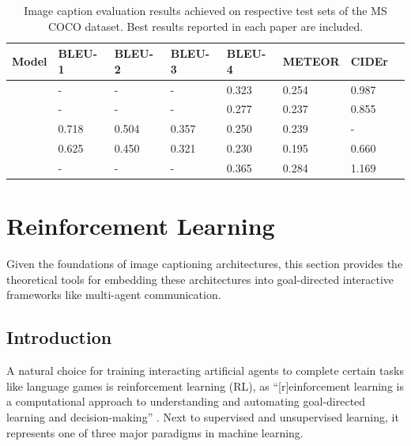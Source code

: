\begin{table}[]
	\begin{tabularx}{\textwidth}{|X|l|l|l|l|l|l|l|}
		\hline
		Model                               & BLEU-1 & BLEU-2 & BLEU-3 & BLEU-4 & METEOR & CIDEr \\ \hline
		\cite{bengio2015scheduled}        & -      & -      & -      & 0.323   & 0.254  & 0.987 \\ \hline
		\cite{vinyals2015show}  & -      & -      & -      & 0.277    & 0.237  & 0.855 \\ \hline
		\cite{xu2015show} & 0.718  & 0.504  & 0.357  & 0.250     & 0.239  & -     \\ \hline
		\cite{karpathy2015deep}          & 0.625  & 0.450  & 0.321  & 0.230   & 0.195  & 0.660 \\ \hline
		\cite{zhou2019unified}          & -  & -  & -  & 0.365   & 0.284  & 1.169  \\ \hline
	\end{tabularx}
\caption{\label{tab_coco_metrics_ref}Image caption evaluation results achieved on respective test sets of the MS COCO dataset. Best results reported in each paper are included.}
\end{table}

\section{Reinforcement Learning}
\label{rl}

Given the foundations of image captioning architectures, this section provides the theoretical tools for embedding these architectures into goal-directed interactive frameworks like multi-agent communication.

\subsection{Introduction}
A natural choice for training interacting artificial agents to complete certain tasks like language games is reinforcement learning (RL), as ``[r]einforcement learning is a computational approach to understanding and automating goal-directed learning and decision-making'' \parencite[][p.~15]{sutton2018reinforcement}. Next to supervised and unsupervised learning, it represents one of three major paradigms in machine learning. 

